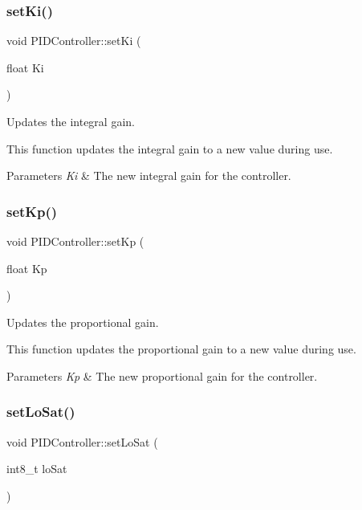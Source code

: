 \subsubsection{\texorpdfstring{set\+Ki()}{setKi()}}
{\footnotesize\ttfamily void P\+I\+D\+Controller\+::set\+Ki (\begin{DoxyParamCaption}\item[{float}]{Ki }\end{DoxyParamCaption})}



Updates the integral gain. 

This function updates the integral gain to a new value during use. 
\begin{DoxyParams}{Parameters}
{\em Ki} & The new integral gain for the controller. \\
\hline
\end{DoxyParams}
\mbox{\label{class_p_i_d_controller_aa3f88f9bfd07c96e1af116056ea2f368}} 
\subsubsection{\texorpdfstring{set\+Kp()}{setKp()}}
{\footnotesize\ttfamily void P\+I\+D\+Controller\+::set\+Kp (\begin{DoxyParamCaption}\item[{float}]{Kp }\end{DoxyParamCaption})}



Updates the proportional gain. 

This function updates the proportional gain to a new value during use. 
\begin{DoxyParams}{Parameters}
{\em Kp} & The new proportional gain for the controller. \\
\hline
\end{DoxyParams}
\mbox{\label{class_p_i_d_controller_ab1ef75c91c9d2c7e52c328194063d870}} 
\subsubsection{\texorpdfstring{set\+Lo\+Sat()}{setLoSat()}}
{\footnotesize\ttfamily void P\+I\+D\+Controller\+::set\+Lo\+Sat (\begin{DoxyParamCaption}\item[{int8\+\_\+t}]{lo\+Sat }\end{DoxyParamCaption})}



